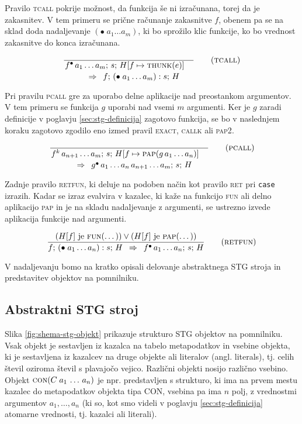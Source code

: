 Pravilo \textsc{tcall} pokrije možnost, da funkcija še ni izračunana, torej da je zakasnitev. V tem primeru se prične računanje zakasnitve $f$, obenem pa se na sklad doda nadaljevanje $(\bullet \; a_1 \dots a_m)$, ki bo sprožilo klic funkcije, ko bo vrednost zakasnitve do konca izračunana.

\begin{equation}
	\linfer[tcall]{}{
		f^\bullet \, a_1 \dots a_m ; \, s; \, H[f \mapsto \textsc{thunk}(e)]
	}{
		f; \, (\bullet \; a_1 \dots a_m) : s; \, H
	}
\end{equation}

Pri pravilu \textsc{pcall} gre za uporabo delne aplikacije nad preostankom argumentov. V tem primeru se funkcija $g$ uporabi nad vsemi $m$ argumenti. Ker je $g$ zaradi definicije v poglavju \ref{sec:stg-definicija} zagotovo funkcija, se bo v naslednjem koraku zagotovo zgodilo eno izmed pravil \textsc{exact}, \textsc{callk} ali \textsc{pap2}.

\begin{equation}
	\linfer[pcall]{}{
		f^k \, a_{n + 1} \dots a_m ; \, s; \, H[f \mapsto \textsc{pap}(g \, a_1 \dots a_n)]
	}{
		g^\bullet \, a_1 \dots a_n \, a_{n + 1} \dots a_m; \, s; \, H
	}
\end{equation}

Zadnje pravilo \textsc{retfun}, ki deluje na podoben način kot pravilo \textsc{ret} pri \texttt{case} izrazih. Kadar se izraz evalvira v kazalec, ki kaže na funkcijo \textsc{fun} ali delno aplikacijo \textsc{pap} in je na skladu nadaljevanje z argumenti, se ustrezno izvede aplikacija funkcije nad argumenti.

\begin{equation}
	\infer[retfun]{
		(\text{$H[f]$ je \textsc{fun}(\dots)}) \lor (\text{$H[f]$ je \textsc{pap}(\dots)})
	}{
		f; \, (\bullet \; a_1 \dots a_n) : s; \, H
	}{
		f^\bullet \, a_1 \dots a_n; \, s; \, H
	}
\end{equation}

V nadaljevanju bomo na kratko opisali delovanje abstraktnega STG stroja in predstavitev objektov na pomnilniku.

\subsection{Abstraktni STG stroj}
\label{sec:abstraktni-stg-stroj}


Slika \ref{fig:shema-stg-objekt} prikazuje strukturo STG objektov na pomnilniku. Vsak objekt je sestavljen iz kazalca na tabelo metapodatkov in vsebine objekta, ki je sestavljena iz kazalcev na druge objekte ali literalov (angl. literals), tj. celih števil oziroma števil s plavajočo vejico. Različni objekti nosijo različno vsebino. Objekt $\textsc{con}(C \; a_1 \, \dots \, a_n)$ je npr. predstavljen s strukturo, ki ima na prvem mestu kazalec do metapodatkov objekta tipa CON, vsebina pa ima $n$ polj, z vrednostmi argumentov $a_1, \dots, a_n$ (ki so, kot smo videli v poglavju \ref{sec:stg-definicija} atomarne vrednosti, tj. kazalci ali literali). 

